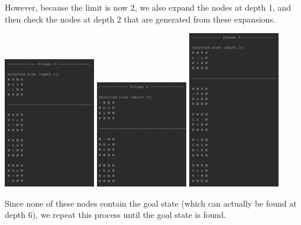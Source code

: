 \documentclass{article}
\begin{document}
	\newpage
	However, because the limit is now 2, we also expand the nodes at depth 1, and then check the nodes at depth 2 that are generated from these expansions.
	\begin{multicols}{3}[\columnsep=2cm]
		\includegraphics[width=0.3\textwidth,keepaspectratio]{IDS-1-3-1.png}
		\columnbreak
		\includegraphics[width=0.3\textwidth,keepaspectratio]{IDS-1-3-2.png}
		\columnbreak
		\includegraphics[width=0.3\textwidth,keepaspectratio]{IDS-1-3-3.png}
	\end{multicols}

	\newpage
	Since none of these nodes contain the goal state (which can actually be found at depth 6), we repeat this process until the goal state is found.
	
\end{document}
